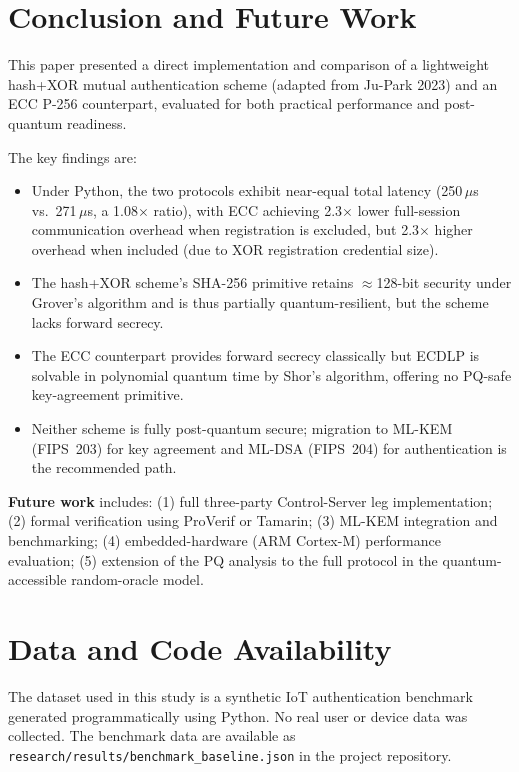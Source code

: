 \documentclass[journal]{IEEEtran}
\begin{document}
\section{Conclusion and Future Work}
\label{sec:conclusion}

This paper presented a direct implementation and comparison of a lightweight
hash+XOR mutual authentication scheme (adapted from Ju-Park 2023) and an
ECC P-256 counterpart, evaluated for both practical performance and
post-quantum readiness.

The key findings are:
\begin{itemize}
  \item Under Python, the two protocols exhibit near-equal total latency
    (250\,$\mu$s vs.\ 271\,$\mu$s, a 1.08$\times$ ratio), with ECC achieving
    2.3$\times$ lower full-session communication overhead when registration is
    excluded, but 2.3$\times$ higher overhead when included (due to XOR
    registration credential size).
  \item The hash+XOR scheme's SHA-256 primitive retains $\approx$128-bit
    security under Grover's algorithm and is thus partially quantum-resilient,
    but the scheme lacks forward secrecy.
  \item The ECC counterpart provides forward secrecy classically but ECDLP is
    solvable in polynomial quantum time by Shor's algorithm, offering no
    PQ-safe key-agreement primitive.
  \item Neither scheme is fully post-quantum secure; migration to ML-KEM
    (FIPS~203) for key agreement and ML-DSA (FIPS~204) for authentication is
    the recommended path.
\end{itemize}

\textbf{Future work} includes: (1) full three-party Control-Server leg
implementation; (2) formal verification using ProVerif or Tamarin; (3) ML-KEM
integration and benchmarking; (4) embedded-hardware (ARM Cortex-M) performance
evaluation; (5) extension of the PQ analysis to the full protocol in the
quantum-accessible random-oracle model.

\section*{Data and Code Availability}

The dataset used in this study is a synthetic IoT authentication benchmark
generated programmatically using Python. No real user or device data was
collected. The benchmark data are available as
\texttt{research/results/benchmark\_baseline.json} in the project repository.
\end{document}
